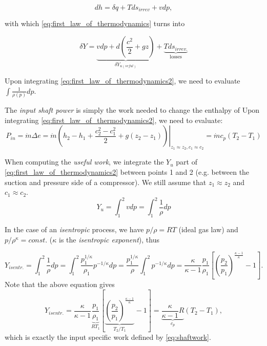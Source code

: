 \begin{equation}
dh=\delta q + T d s_{irrev} + vdp,
\end{equation}

\noindent with which \eqref{eq:first_law_of_thermodynamics} turns into

\begin{equation}
\boxed{\delta Y =\underbrace{vdp+d\left(\frac{c^2}{2}+gz\right)}_{\delta Y_{u(seful)}}
+\underbrace{T d s_{irrev.}}_{\text{losses}}}
\label{eq:first_law_of_thermodynamics2}
\end{equation}

Upon integrating \eqref{eq:first_law_of_thermodynamics2}, we need to evaluate $\int \frac{1}{\rho(p)} dp$.

The \emph{input shaft power} is simply the work needed to change the enthalpy of Upon integrating \eqref{eq:first_law_of_thermodynamics2}, we need to evaluate:
\begin{equation}
P_{in}=\dot{m} \Delta e = \left.\dot{m} \left( h_2-h_1 + \frac{c_2^2-c_1^2}{2} + g(z_2-z_1)\right)\right|_{z_1\approx z_2, c_1\approx c_2}=\dot{m} c_p \left(T_2-T_1\right)
\label{eq:shaftwork}
\end{equation}

When computing the \emph{useful work}, we integrate the $Y_u$ part of \eqref{eq:first_law_of_thermodynamics2} between points 1 and 2 (e.g. between the suction and pressure side of a compressor). We still assume that $z_1\approx z_2$ and $c_1 \approx c_2$.
\begin{equation}
Y_u = \int_1^2 v dp = \int_1^2 \frac{1}{\rho} dp
\end{equation}

In the case of an \emph{isentropic} process, we have $p/\rho=RT$ (ideal gas law) and $p/\rho^\kappa=const.$ ($\kappa$ is the \emph{isentropic exponent}), thus

\begin{equation}
Y_{isentr.}= \int_1^2 \frac{1}{\rho} dp = \int_1^2 \frac{p_1^{1/\kappa}}{\rho_1} p^{-1/\kappa}dp = \frac{p_1^{1/\kappa}}{\rho}\int_1^2 p^{-1/\kappa} dp = \frac{\kappa}{\kappa-1}\frac{p_1}{\rho_1} \left[\left(\frac{p_2}{p_1}\right)^{\frac{\kappa-1}{\kappa}}-1\right].
\end{equation}
%
Note that the above equation gives
\begin{equation}
Y_{isentr.}= \frac{\kappa}{\kappa-1}\underbrace{\frac{p_1}{\rho_1}}_{R T_1} \left[\underbrace{\left(\frac{p_2}{p_1}\right)^{\frac{\kappa-1}{\kappa}}}_{T_2/T_1}-1\right] = \underbrace{\frac{\kappa}{\kappa-1} R }_{c_p}\left(T_2-T_1\right),
\end{equation}
%
which is exactly the input specific work defined by \eqref{eq:shaftwork}.

